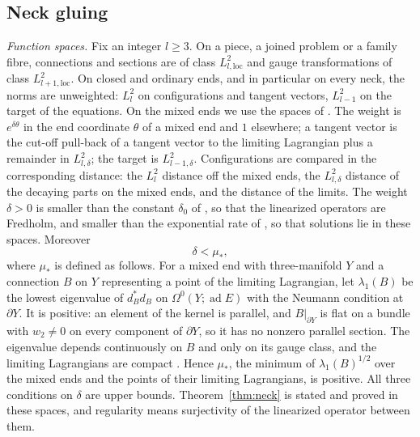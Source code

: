 \documentclass[11pt]{amsart}
\theoremstyle{definition}
\theoremstyle{remark}
\theoremstyle{plain}
\numberwithin{equation}{section}
\newcommand{\ad}{\operatorname{ad}}
\begin{document}
\subsection{Neck gluing}

\emph{Function spaces.} Fix an integer $l\ge3$. On a piece, a joined problem
or a family fibre, connections and sections are of class $L^2_{l,\mathrm{loc}}$
and gauge transformations of class $L^2_{l+1,\mathrm{loc}}$. On closed and
ordinary ends, and in particular on every neck, the norms are unweighted:
$L^2_l$ on configurations and tangent vectors, $L^2_{l-1}$ on the target of
the equations. On the mixed ends we use the spaces of
\cite[Definitions~3.8--3.9, (4.5) and (4.8)]{DFL}. The weight is
$e^{\delta\theta}$ in the end coordinate $\theta$ of a mixed end and $1$
elsewhere; a tangent vector is the cut-off pull-back of a tangent vector to
the limiting Lagrangian plus a remainder in $L^2_{l,\delta}$; the target is
$L^2_{l-1,\delta}$. Configurations are compared in the corresponding
distance: the $L^2_l$ distance off the mixed ends, the $L^2_{l,\delta}$
distance of the decaying parts on the mixed ends, and the distance of the
limits. The weight $\delta>0$ is smaller than the constant $\delta_0$ of
\cite[(4.24)]{DFL}, so that the linearized operators are Fredholm, and
smaller than the exponential rate of \cite[Proposition~5.29]{DFL}, so that
solutions lie in these spaces. Moreover
\begin{equation}\label{eq:neck-weight}
\delta<\mu_*,
\end{equation}
where $\mu_*$ is defined as follows. For a mixed end with three-manifold $Y$
and a connection $B$ on $Y$ representing a point of the limiting Lagrangian,
let $\lambda_1(B)$ be the lowest eigenvalue of $d_B^*d_B$ on
$\Omega^0(Y;\ad E)$ with the Neumann condition at $\partial Y$. It is
positive: an element of the kernel is parallel, and $B|_{\partial Y}$ is flat
on a bundle with $w_2\ne0$ on every component of $\partial Y$, so it has no
nonzero parallel section. The eigenvalue depends continuously on $B$ and only
on its gauge class, and the limiting Lagrangians are compact
\cite[paragraph after Proposition~2.16]{DFL}. Hence $\mu_*$, the minimum of
$\lambda_1(B)^{1/2}$ over the mixed ends and the points of their limiting
Lagrangians, is positive. All three conditions on $\delta$ are upper bounds.
Theorem~\ref{thm:neck} is stated and proved in these spaces, and regularity
means surjectivity of the linearized operator between them.
\end{document}
